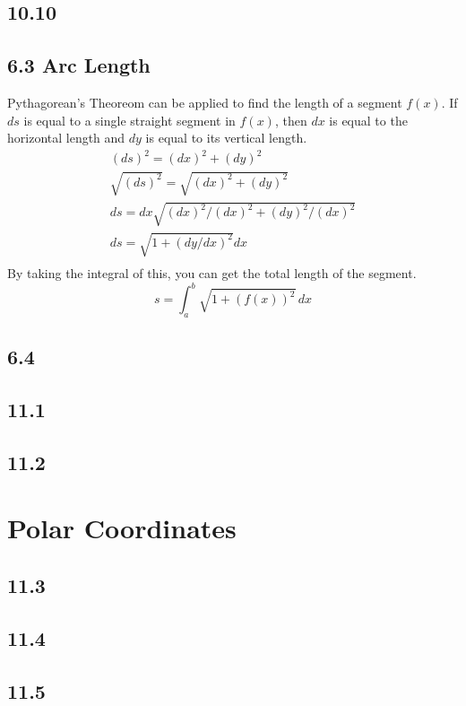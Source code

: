 \documentclass{article}
\begin{document}
        \subsection*{10.10}
        \color{OliveGreen}
        \subsection*{6.3 Arc Length}
            Pythagorean's Theoreom can be applied to find the length of a segment \(f(x)\).
            If \(ds\) is equal to a single straight segment in \(f(x)\), then  \(dx\) is equal to the horizontal length and \(dy\) is equal to its vertical length. 
            \begin{equation}
                \begin{split}
                    (ds)^2 = (dx)^2 + (dy)^2 \\
                    \sqrt{(ds)^2} = \sqrt{(dx)^2 + (dy)^2}\\
                    ds = dx  \sqrt{(dx)^2 / (dx)^2 + (dy)^2 / (dx) ^2}\\
                    ds = \sqrt{1 + (dy/dx)^2}dx\\
                \end{split}
            \end{equation}
            By taking the integral of this, you can get the total length of the segment.
            \begin{equation}
                s = \int_a^b \sqrt{1 + (f(x))^2} \, dx
            \end{equation}
        \color{Black}
        \subsection*{6.4}
        \subsection*{11.1}
        \subsection*{11.2}
    \section{Polar Coordinates}
        \subsection*{11.3}
        \subsection*{11.4}
        \subsection*{11.5}
\end{document}
